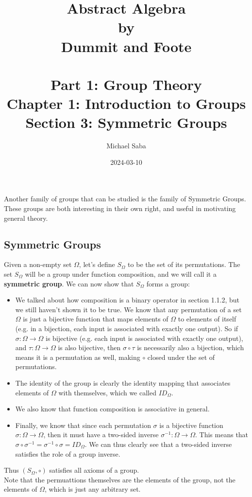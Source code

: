 \documentclass[12pt]{article}
\title{%
    \Huge Abstract Algebra \\
    \large by \\
    \Large Dummit and Foote \\~\\
    \huge Part 1: Group Theory \\
    \LARGE Chapter 1: Introduction to Groups \\
    \Large Section 3: Symmetric Groups
}
\date{2024-03-10}
\author{Michael Saba}
\begin{document}
    \maketitle
    \newpage


    Another family of groups that can be studied
    is the family of Symmetric Groups. \\
    These groups are both interesting in their own right,
    and useful in motivating general theory. \\

    \subsection*{Symmetric Groups}

    Given a non-empty set $\Omega$,
    let's define $S_\Omega$ to be the set of its permutations.
    The set $S_\Omega$ will be a group under function composition,
    and we will call it a \textbf{symmetric group}.
    We can now show that $S_\Omega$ forms a group:
    \begin{itemize}[label=$\diamond$]
        \item 
            We talked about how composition is a binary operator
            in section 1.1.2, but we still haven't shown it to be true.
            We know that any permutation of a set $\Omega$
            is just a bijective function
            that maps elements of $\Omega$ to elements of itself
            (e.g. in a bijection,
            each input is associated with exactly one output).
            So if $\sigma: \Omega \rightarrow \Omega$ is bijective
            (e.g. each input is associated with exactly one output),
            and $\tau: \Omega \rightarrow \Omega$ is also bijective,
            then $\sigma \circ \tau$ is necessarily also a bijection,
            which means it is a permutation as well,
            making $\circ$ closed under the set of permutations.
        \item 
            The identity of the group is clearly the identity mapping
            that associates elements of $\Omega$ with themselves,
            which we called $ID_\Omega$.
        \item
            We also know that function composition is associative in general.
        \item
            Finally, we know that since each permutation $\sigma$
            is a bijective function  $\sigma: \Omega \rightarrow \Omega$, 
            then it must have a two-sided inverse
            $\sigma^{-1}: \Omega \rightarrow \Omega$.
            This means that
            $\sigma \circ \sigma^{-1} = \sigma^{-1} \circ \sigma = ID_\Omega$.
            We can thus clearly see that a two-sided inverse
            satisfies the role of a group inverse.

    \end{itemize}
    Thus $(S_\Omega, \circ)$ satisfies all axioms of a group. \\
    Note that the permuattions themselves are the elements 
    of the group,
    not the elements of $\Omega$, which is just any arbitrary set. \\
\end{document}
